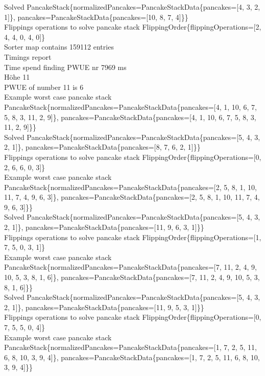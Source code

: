 Solved PancakeStack\{normalizedPancakes=PancakeStackData\{pancakes=[4, 3, 2, 1]\}, pancakes=PancakeStackData\{pancakes=[10, 8, 7, 4]\}\} \\
Flippings operations to solve pancake stack FlippingOrder\{flippingOperations=[2, 4, 4, 0, 4, 0]\} \\
Sorter map contains 159112 entries \\
Timings report \\
Time spend finding PWUE nr 7969 ms \\
Höhe 11 \\
PWUE of number 11 is 6 \\
Example worst case pancake stack PancakeStack\{normalizedPancakes=PancakeStackData\{pancakes=[4, 1, 10, 6, 7, 5, 8, 3, 11, 2, 9]\}, pancakes=PancakeStackData\{pancakes=[4, 1, 10, 6, 7, 5, 8, 3, 11, 2, 9]\}\} \\
Solved PancakeStack\{normalizedPancakes=PancakeStackData\{pancakes=[5, 4, 3, 2, 1]\}, pancakes=PancakeStackData\{pancakes=[8, 7, 6, 2, 1]\}\} \\
Flippings operations to solve pancake stack FlippingOrder\{flippingOperations=[0, 2, 6, 6, 0, 3]\} \\
Example worst case pancake stack PancakeStack\{normalizedPancakes=PancakeStackData\{pancakes=[2, 5, 8, 1, 10, 11, 7, 4, 9, 6, 3]\}, pancakes=PancakeStackData\{pancakes=[2, 5, 8, 1, 10, 11, 7, 4, 9, 6, 3]\}\} \\
Solved PancakeStack\{normalizedPancakes=PancakeStackData\{pancakes=[5, 4, 3, 2, 1]\}, pancakes=PancakeStackData\{pancakes=[11, 9, 6, 3, 1]\}\} \\
Flippings operations to solve pancake stack FlippingOrder\{flippingOperations=[1, 7, 5, 0, 3, 1]\} \\
Example worst case pancake stack PancakeStack\{normalizedPancakes=PancakeStackData\{pancakes=[7, 11, 2, 4, 9, 10, 5, 3, 8, 1, 6]\}, pancakes=PancakeStackData\{pancakes=[7, 11, 2, 4, 9, 10, 5, 3, 8, 1, 6]\}\} \\
Solved PancakeStack\{normalizedPancakes=PancakeStackData\{pancakes=[5, 4, 3, 2, 1]\}, pancakes=PancakeStackData\{pancakes=[11, 9, 5, 3, 1]\}\} \\
Flippings operations to solve pancake stack FlippingOrder\{flippingOperations=[0, 7, 5, 5, 0, 4]\} \\
Example worst case pancake stack PancakeStack\{normalizedPancakes=PancakeStackData\{pancakes=[1, 7, 2, 5, 11, 6, 8, 10, 3, 9, 4]\}, pancakes=PancakeStackData\{pancakes=[1, 7, 2, 5, 11, 6, 8, 10, 3, 9, 4]\}\} \\
